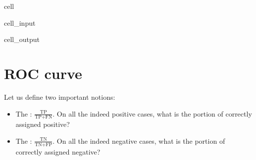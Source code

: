 \documentclass[letterpaper,10pt,english]{jupyterBook}
\begin{document}
\begin{sphinxuseclass}{cell}\begin{sphinxVerbatimInput}

\begin{sphinxuseclass}{cell_input}
\begin{sphinxVerbatim}[commandchars=\\\{\}]
 
   
   

   
   
\end{sphinxVerbatim}

\end{sphinxuseclass}\end{sphinxVerbatimInput}
\begin{sphinxVerbatimOutput}

\begin{sphinxuseclass}{cell_output}
\noindent{}

\noindent{}

\end{sphinxuseclass}\end{sphinxVerbatimOutput}

\end{sphinxuseclass}

\section{ROC curve}
\label{\detokenize{06:roc-curve}}
\sphinxAtStartPar
Let us define two important notions:
\begin{itemize}
\item {} 
\sphinxAtStartPar
The : \(\frac{\text{TP}}{\text{TP}+\text{FN}}\). On all the indeed positive cases, what is the portion of correctly assigned positive?

\item {} 
\sphinxAtStartPar
The : \(\frac{\text{TN}}{\text{TN}+\text{FP}}\). On all the indeed negative cases, what is the portion of correctly assigned negative?

\end{itemize}
\end{document}
